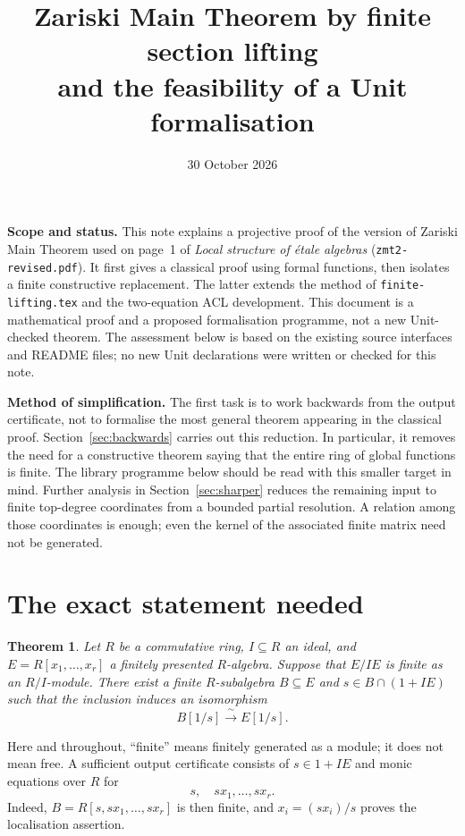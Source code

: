 \documentclass[11pt]{amsart}
\title[Zariski Main Theorem by finite section lifting]{Zariski Main Theorem by finite section lifting\\
and the feasibility of a Unit formalisation}
\date{30 October 2026}
\newtheorem{theorem}{Theorem}[section]
\theoremstyle{definition}
\theoremstyle{remark}
\newcommand{\code}[1]{\texttt{#1}}
\begin{document}
\maketitle

\noindent\textbf{Scope and status.}
This note explains a projective proof of the version of Zariski Main
Theorem used on page~1 of \emph{Local structure of \'etale algebras}
(\code{zmt2-revised.pdf}). It first gives a classical proof using formal
functions, then isolates a finite constructive replacement. The latter
extends the method of \code{finite-lifting.tex} and the two-equation
ACL development. This document is a mathematical proof and a proposed
formalisation programme, not a new Unit-checked theorem. The assessment
below is based on the existing source interfaces and README files; no
new Unit declarations were written or checked for this note.

\medskip
\noindent\textbf{Method of simplification.}
The first task is to work backwards from the output certificate, not
to formalise the most general theorem appearing in the classical
proof. Section~\ref{sec:backwards} carries out this reduction. In
particular, it removes the need for a constructive theorem saying that
the entire ring of global functions is finite. The library programme
below should be read with this smaller target in mind. Further analysis
in Section~\ref{sec:sharper} reduces the remaining input to finite
top-degree coordinates from a bounded partial resolution. A relation
among those coordinates is enough; even the kernel of the associated
finite matrix need not be generated.

\section{The exact statement needed}

\begin{theorem}\label{thm:zmt}
Let $R$ be a commutative ring, $I\subseteq R$ an ideal, and
$E=R[x_1,\ldots,x_r]$ a finitely presented $R$-algebra. Suppose that
$E/IE$ is finite as an $R/I$-module. There exist a finite
$R$-subalgebra $B\subseteq E$ and $s\in B\cap(1+IE)$ such that the
inclusion induces an isomorphism
\[
 B[1/s]\xrightarrow{\ \sim\ }E[1/s].
\]
\end{theorem}

Here and throughout, ``finite'' means finitely generated as a module;
it does not mean free. A sufficient output certificate consists of
$s\in1+IE$ and monic equations over $R$ for
\[
 s,\quad sx_1,\ldots,sx_r.
\]
Indeed, $B=R[s,sx_1,\ldots,sx_r]$ is then finite, and
$x_i=(sx_i)/s$ proves the localisation assertion.
\end{document}

